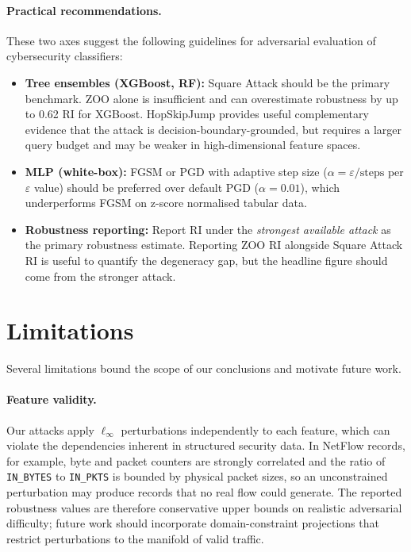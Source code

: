 \documentclass[runningheads]{llncs}
\begin{document}
\paragraph{Practical recommendations.}
These two axes suggest the following guidelines for adversarial evaluation of
cybersecurity classifiers:
\begin{itemize}
  \item \textbf{Tree ensembles (XGBoost, RF):}  Square Attack should be the
    primary benchmark.  ZOO alone is insufficient and can overestimate robustness
    by up to 0.62 RI for XGBoost.  HopSkipJump provides useful complementary
    evidence that the attack is decision-boundary-grounded, but requires a
    larger query budget and may be weaker in high-dimensional feature spaces.
  \item \textbf{MLP (white-box):}  FGSM or PGD with adaptive step size
    ($\alpha = \varepsilon/\text{steps}$ per $\varepsilon$ value) should be
    preferred over default PGD ($\alpha = 0.01$), which underperforms FGSM on
    z-score normalised tabular data.
  \item \textbf{Robustness reporting:}  Report RI under the \emph{strongest
    available attack} as the primary robustness estimate.  Reporting ZOO RI
    alongside Square Attack RI is useful to quantify the degeneracy gap, but
    the headline figure should come from the stronger attack.
\end{itemize}

\section{Limitations}
\label{sec:limitations}

Several limitations bound the scope of our conclusions and motivate future work.

\paragraph{Feature validity.}
Our attacks apply $\ell_\infty$ perturbations independently to each feature,
which can violate the dependencies inherent in structured security data.  In
NetFlow records, for example, byte and packet counters are strongly correlated
and the ratio of \texttt{IN\_BYTES} to \texttt{IN\_PKTS} is bounded by physical
packet sizes, so an unconstrained perturbation may produce records that no real
flow could generate.  The reported robustness values are therefore conservative
upper bounds on realistic adversarial difficulty; future work should incorporate
domain-constraint projections that restrict perturbations to the manifold of
valid traffic.
\end{document}
